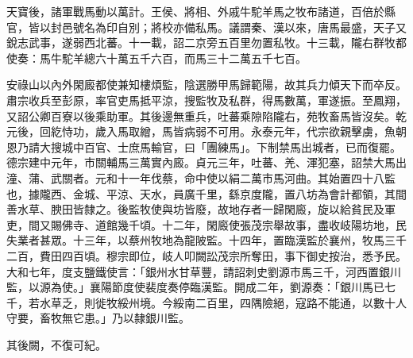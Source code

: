 \begin{pinyinscope}
 天寶後，諸軍戰馬動以萬計。王侯、將相、外戚牛駝羊馬之牧布諸道，百倍於縣官，皆以封邑號名為印自別；將校亦備私馬。議謂秦、漢以來，唐馬最盛，天子又銳志武事，遂弱西北蕃。十一載，詔二京旁五百里勿置私牧。十三載，隴右群牧都使奏：馬牛駝羊總六十萬五千六百，而馬三十二萬五千七百。



 安祿山以內外閑廄都使兼知樓煩監，陰選勝甲馬歸範陽，故其兵力傾天下而卒反。肅宗收兵至彭原，率官吏馬抵平涼，搜監牧及私群，得馬數萬，軍遂振。至鳳翔，又詔公卿百寮以後乘助軍。其後邊無重兵，吐蕃乘隙陷隴右，苑牧畜馬皆沒矣。乾元後，回紇恃功，歲入馬取繒，馬皆病弱不可用。永泰元年，代宗欲親擊虜，魚朝恩乃請大搜城中百官、士庶馬輸官，曰「團練馬」。下制禁馬出城者，已而復罷。德宗建中元年，市關輔馬三萬實內廄。貞元三年，吐蕃、羌、渾犯塞，詔禁大馬出潼、蒲、武關者。元和十一年伐蔡，命中使以絹二萬市馬河曲。其始置四十八監也，據隴西、金城、平涼、天水，員廣千里，繇京度隴，置八坊為會計都領，其間善水草、腴田皆隸之。後監牧使與坊皆廢，故地存者一歸閑廄，旋以給貧民及軍吏，間又賜佛寺、道館幾千頃。十二年，閑廄使張茂宗舉故事，盡收岐陽坊地，民失業者甚眾。十三年，以蔡州牧地為龍陂監。十四年，置臨漢監於襄州，牧馬三千二百，費田四百頃。穆宗即位，岐人叩闕訟茂宗所奪田，事下御史按治，悉予民。大和七年，度支鹽鐵使言：「銀州水甘草豐，請詔刺史劉源市馬三千，河西置銀川監，以源為使。」襄陽節度使裴度奏停臨漢監。開成二年，劉源奏：「銀川馬已七千，若水草乏，則徙牧綏州境。今綏南二百里，四隅險絕，寇路不能通，以數十人守要，畜牧無它患。」乃以隸銀川監。



 其後闕，不復可紀。



\end{pinyinscope}